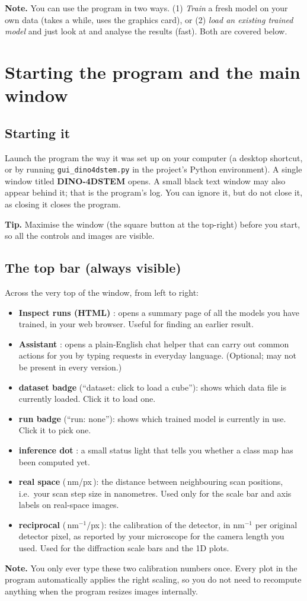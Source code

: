 \documentclass[11pt]{article}
\newcommand{\btn}[1]{\textbf{#1}}
\newcommand{\tab}[1]{\textsf{\textbf{#1}}}
\newcommand{\tip}[1]{\par\smallskip\noindent\colorbox{tipc}{\parbox{\dimexpr\linewidth-2\fboxsep}{\textbf{Tip.} #1}}\par\smallskip}
\newcommand{\note}[1]{\par\smallskip\noindent\colorbox{soft}{\parbox{\dimexpr\linewidth-2\fboxsep}{\textbf{Note.} #1}}\par\smallskip}
\begin{document}
\note{You can use the program in two ways. (1) \emph{Train} a fresh model on your
own data (takes a while, uses the graphics card), or (2) \emph{load an existing
trained model} and just look at and analyse the results (fast). Both are covered
below.}

\section{Starting the program and the main window}
\subsection{Starting it}
Launch the program the way it was set up on your computer (a desktop shortcut, or
by running \texttt{gui\_dino4dstem.py} in the project's Python environment). A
single window titled \tab{DINO-4DSTEM} opens. A small black text window may also
appear behind it; that is the program's log. You can ignore it, but do not close
it, as closing it closes the program.

\tip{Maximise the window (the square button at the top-right) before you start, so
all the controls and images are visible.}

\subsection{The top bar (always visible)}
Across the very top of the window, from left to right:
\begin{itemize}[itemsep=3pt]
\item \btn{Inspect runs (HTML)} : opens a summary page of all the models you have
trained, in your web browser. Useful for finding an earlier result.
\item \btn{Assistant} : opens a plain-English chat helper that can carry out
common actions for you by typing requests in everyday language. (Optional; may not
be present in every version.)
\item \textbf{dataset badge} (``dataset: click to load a cube''): shows which data
file is currently loaded. Click it to load one.
\item \textbf{run badge} (``run: none''): shows which trained model is currently
in use. Click it to pick one.
\item \textbf{inference dot} : a small status light that tells you whether a class
map has been computed yet.
\item \textbf{real space} (\,nm/px\,): the distance between neighbouring scan
positions, i.e.\ your scan step size in nanometres. Used only for the scale bar and
axis labels on real-space images.
\item \textbf{reciprocal} (\,nm$^{-1}$/px\,): the calibration of the detector, in
nm$^{-1}$ per original detector pixel, as reported by your microscope for the
camera length you used. Used for the diffraction scale bars and the 1D plots.
\end{itemize}
\note{You only ever type these two calibration numbers once. Every plot in the
program automatically applies the right scaling, so you do not need to recompute
anything when the program resizes images internally.}
\end{document}
